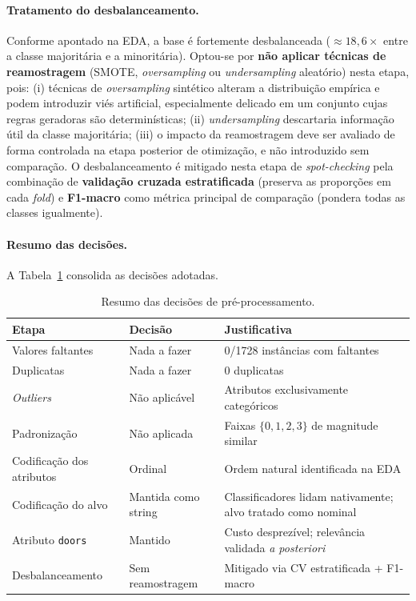 \documentclass[11pt,a4paper]{article}
\newcommand{\code}[1]{\texttt{\small #1}}
\begin{document}
\paragraph{Tratamento do desbalanceamento.}
Conforme apontado na EDA, a base é fortemente desbalanceada ($\approx 18{,}6\times$ entre a classe majoritária e a minoritária). Optou-se por \textbf{não aplicar técnicas de reamostragem} (SMOTE, \textit{oversampling} ou \textit{undersampling} aleatório) nesta etapa, pois: (i) técnicas de \textit{oversampling} sintético alteram a distribuição empírica e podem introduzir viés artificial, especialmente delicado em um conjunto cujas regras geradoras são determinísticas; (ii) \textit{undersampling} descartaria informação útil da classe majoritária; (iii) o impacto da reamostragem deve ser avaliado de forma controlada na etapa posterior de otimização, e não introduzido sem comparação. O desbalanceamento é mitigado nesta etapa de \textit{spot-checking} pela combinação de \textbf{validação cruzada estratificada} (preserva as proporções em cada \textit{fold}) e \textbf{F1-macro} como métrica principal de comparação (pondera todas as classes igualmente).

\paragraph{Resumo das decisões.}
A Tabela~\ref{tab:preproc_summary} consolida as decisões adotadas.

\begin{table}[H]
\centering
\caption{Resumo das decisões de pré-processamento.}
\label{tab:preproc_summary}
\small
\begin{tabular}{lll}
\toprule
\textbf{Etapa} & \textbf{Decisão} & \textbf{Justificativa} \\
\midrule
Valores faltantes         & Nada a fazer         & 0/1728 instâncias com faltantes \\
Duplicatas                & Nada a fazer         & 0 duplicatas \\
\textit{Outliers}         & Não aplicável        & Atributos exclusivamente categóricos \\
Padronização              & Não aplicada         & Faixas $\{0,1,2,3\}$ de magnitude similar \\
Codificação dos atributos & Ordinal              & Ordem natural identificada na EDA \\
Codificação do alvo       & Mantida como string  & Classificadores lidam nativamente; alvo tratado como nominal \\
Atributo \code{doors}     & Mantido              & Custo desprezível; relevância validada \textit{a posteriori} \\
Desbalanceamento          & Sem reamostragem     & Mitigado via CV estratificada + F1-macro \\
\bottomrule
\end{tabular}
\end{table}
\end{document}
